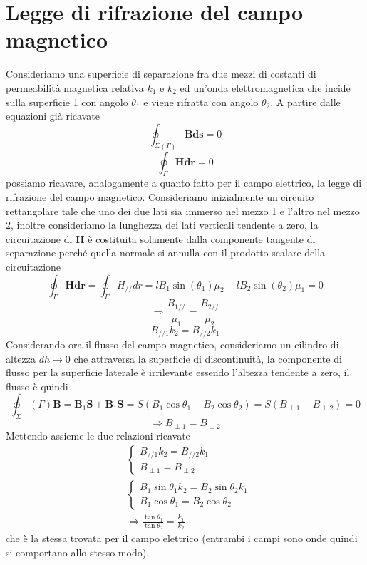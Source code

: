 \documentclass[
10pt, %
a4paper, %
oneside, %
headinclude,footinclude, %
BCOR5mm, %
]{scrartcl}
\begin{document}
\section{Legge di rifrazione del campo magnetico}
Consideriamo una superficie di separazione fra due mezzi di costanti di permeabilità magnetica relativa \(k_1\) e \(k_2\) ed un'onda elettromagnetica che incide sulla superficie 1 con angolo $\theta_1$ e viene rifratta con angolo $\theta_2$. A partire dalle equazioni già ricavate
\[\oint_{\Sigma(\Gamma)} \mathbf{B} \mathbf{ds} = 0\]
\[\oint_\Gamma \mathbf{H} \mathbf{dr} = 0\]
possiamo ricavare, analogamente a quanto fatto per il campo elettrico, la legge di rifrazione del campo magnetico. Consideriamo inizialmente un circuito rettangolare tale che uno dei due lati sia immerso nel mezzo 1 e l'altro nel mezzo 2, inoltre consideriamo la lunghezza dei lati verticali tendente a zero, la circuitazione di \(\mathbf{H}\) è costituita solamente dalla componente tangente di separazione perché quella normale si annulla con il prodotto scalare della circuitazione
\[\oint_\Gamma \mathbf{H} \mathbf{dr} = \oint_\Gamma H_{//} dr = l B_1\sin(\theta_1)\mu_2 -  l B_2\sin(\theta_2)\mu_1 = 0\]
\[\Rightarrow \frac{B_{1//}}{\mu_1} = \frac{B_{2//}}{\mu_2}\]
\[B_{//1}k_2 =  B_{//2}k_1\]
Considerando ora il flusso del campo magnetico, consideriamo un cilindro di altezza \(dh\to 0\) che attraversa la superficie di discontinuità, la componente di flusso per la superficie laterale è irrilevante essendo l'altezza tendente a zero, il flusso è quindi
\[\oint_\Sigma(\Gamma)\mathbf{B} = \mathbf{B}_1\mathbf{S} +  \mathbf{B}_1\mathbf{S} = S(B_1\cos\theta_1 -B_2\cos\theta_2)=S(B_{\perp 1}- B_{\perp 2})=0 \]
\[\Rightarrow B_{\perp 1} = B_{\perp 2}\]
Mettendo assieme le due relazioni ricavate
\begin{align*}
	&\begin{cases}
		B_{//1}k_2 =  B_{//2}k_1\\
		B_{\perp 1} = B_{\perp 2}
	\end{cases}\\
	&\begin{cases}
		B_{1}\sin\theta_1 k_2 =  B_{2}\sin\theta_2 k_1\\
		B_{1}\cos\theta_1 = B_{2}\cos\theta_2
	\end{cases}\\
&\Rightarrow \frac{\tan\theta_1}{\tan\theta_2} =\frac{k_1}{k_2}
\end{align*}
che è la stessa trovata per il campo elettrico (entrambi i campi sono onde quindi si comportano allo stesso modo).
\end{document}
